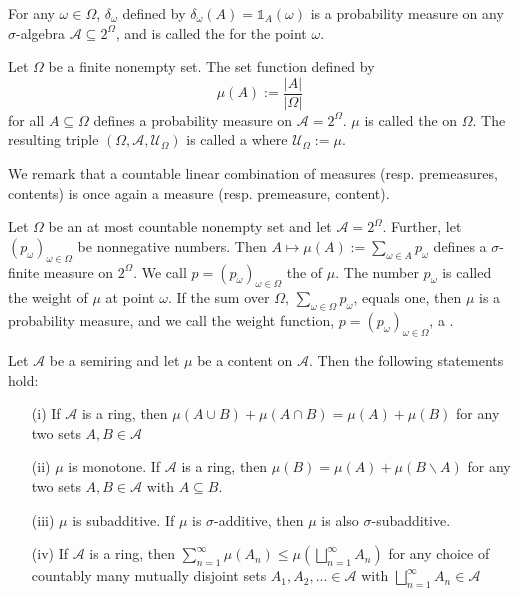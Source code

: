 \documentclass[12pt, a4paper, oneside, openright, titlepage]{book}
\begin{document}
\begin{defn}
    For any $\omega \in \Omega$, $\delta_{\omega}$ defined by $\delta_{\omega}(A) = \mathbb{1}_A(\omega)$ is a probability measure on any $\sigma$-algebra $\mathcal{A} \subseteq 2^{\Omega}$, and is called the  for the point $\omega$.
\end{defn}

\begin{defn}
    Let $\Omega$ be a finite nonempty set. The set function defined by \begin{equation*}
        \mu(A) := \frac{|A|}{|\Omega|}
    \end{equation*}
    for all $A \subseteq \Omega$ defines a probability measure on $\mathcal{A} = 2^{\Omega}$. $\mu$ is called the  on $\Omega$. The resulting triple $(\Omega,\mathcal{A},\mathcal{U}_{\Omega})$ is called a  where $\mathcal{U}_{\Omega} := \mu$.
\end{defn}

We remark that a countable linear combination of measures (resp. premeasures, contents) is once again a measure (resp. premeasure, content). 

\begin{defn}
    Let $\Omega$ be an at most countable nonempty set and let $\mathcal{A} = 2^{\Omega}$. Further, let $(p_{\omega})_{\omega \in \Omega}$ be nonnegative numbers. Then $A\mapsto \mu(A) := \sum_{\omega \in A}p_{\omega}$ defines a $\sigma$-finite measure on $2^{\Omega}$. We call $p = (p_{\omega})_{\omega \in \Omega}$ the  of $\mu$. The number $p_{\omega}$ is called the weight of $\mu$ at point $\omega$. If the sum over $\Omega$, $\sum_{\omega \in \Omega}p_{\omega}$, equals one, then $\mu$ is a probability measure, and we call the weight function, $p = (p_{\omega})_{\omega \in \Omega}$, a .
\end{defn}

\begin{lem}
    Let $\mathcal{A}$ be a semiring and let $\mu$ be a content on $\mathcal{A}$. Then the following statements hold: \begin{itemize}
        \item[(i)] If $\mathcal{A}$ is a ring, then $\mu(A\cup B) + \mu(A\cap B) = \mu(A) + \mu(B)$ for any two sets $A,B \in \mathcal{A}$
        \item[(ii)] $\mu$ is monotone. If $\mathcal{A}$ is a ring, then $\mu(B) = \mu(A) + \mu(B\backslash A)$ for any two sets $A,B \in \mathcal{A}$ with $A\subseteq B$.
        \item[(iii)] $\mu$ is subadditive. If $\mu$ is $\sigma$-additive, then $\mu$ is also $\sigma$-subadditive.
        \item[(iv)] If $\mathcal{A}$ is a ring, then $\sum_{n=1}^{\infty}\mu(A_n) \leq \mu\left(\bigsqcup_{n=1}^{\infty}A_n\right)$ for any choice of countably many mutually disjoint sets $A_1,A_2,... \in \mathcal{A}$ with $\bigsqcup_{n=1}^{\infty}A_n \in \mathcal{A}$
    \end{itemize}
\end{lem}
\end{document}
